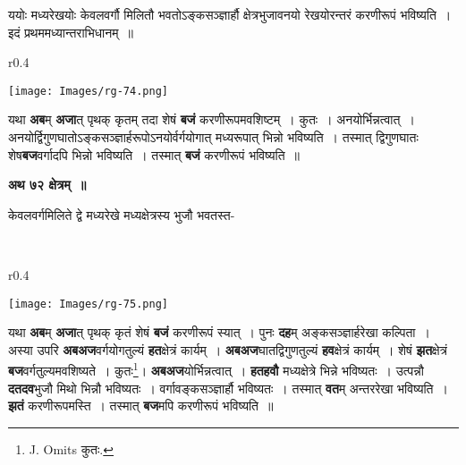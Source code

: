 \documentclass[11pt, openany]{book}
\begin{document}
{\ab ययोः मध्यरेखयोः केवलवर्गौ मिलितौ भवतोऽङ्कसञ्ज्ञार्हौ क्षेत्रभुजावनयो रेखयोरन्तरं करणीरूपं भविष्यति~। इदं प्रथममध्यान्तराभिधानम्~॥ }\\

\begin{wrapfigure}{r}{0.4\textwidth}
\vspace{-7mm}
\begin{flushright}
\texttt{[image: Images/rg-74.png]}
\end{flushright}
\vspace{-8mm}
\end{wrapfigure}

 यथा \textbf{अब}म् \textbf{अजा}त् पृथक् कृतम् तदा शेषं \textbf{बजं} करणीरूपमवशिष्टम्~। कुतः~। अनयोर्भिन्नत्वात्~। अनयोर्द्विगुणघातोऽङ्कसञ्ज्ञार्हरूपोऽनयोर्वर्गयोगात् मध्यरूपात् भिन्नो भविष्यति~। तस्मात् द्विगुणघातः शेष\textbf{बज}वर्गादपि भिन्नो भविष्यति~। तस्मात् \textbf{बजं} करणीरूपं भविष्यति~॥ 
\vspace{2mm}

\begin{center}
\textbf{\large अथ ७२ क्षेत्रम्~॥}
\end{center}

{\ab केवलवर्गमिलिते द्वे मध्यरेखे मध्यक्षेत्रस्य भुजौ भवतस्त-}

\newpage
{}\\

\begin{wrapfigure}{r}{0.4\textwidth}
\vspace{-7mm}
\begin{flushright}
\texttt{[image: Images/rg-75.png]}
\end{flushright}
\vspace{-8mm}
\end{wrapfigure}

 यथा \textbf{अब}म् \textbf{अजा}त् पृथक् कृतं शेषं \textbf{बजं} करणीरूपं स्यात्~। पुनः \textbf{दह}म् अङ्कसञ्ज्ञार्हरेखा कल्पिता~। अस्या उपरि \textbf{अबअज}वर्गयोगतुल्यं \textbf{हत}क्षेत्रं कार्यम्~। \textbf{अबअज}घातद्विगुणतुल्यं \textbf{हव}क्षेत्रं कार्यम्~। शेषं \textbf{झत}क्षेत्रं \textbf{बज}वर्गतुल्यमवशिष्यते~। कुतः\renewcommand{\thefootnote}{२}\footnote{{\en J. Omits} कुतः.}\;। \textbf{अबअज}योर्भिन्नत्वात्~। \textbf{हतहवौ} मध्यक्षेत्रे भिन्ने भविष्यतः~। उत्पन्नौ \textbf{दतदव}भुजौ मिथो भिन्नौ भविष्यतः~। वर्गावङ्कसञ्ज्ञार्हौ भविष्यतः~। तस्मात् \textbf{वत}म् अन्तररेखा भविष्यति~। \textbf{झतं} करणीरूपमस्ति~। तस्मात् \textbf{बज}मपि करणीरूपं भविष्यति~॥ 
\vspace{2mm}
\end{document}

